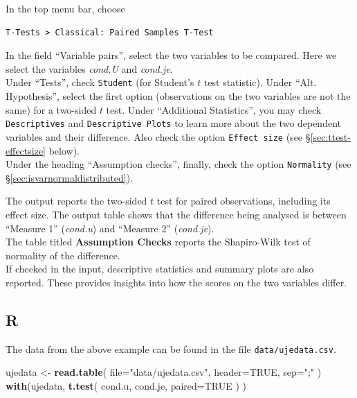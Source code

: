 \documentclass[
]{book}
\newenvironment{Shaded}{\begin{snugshade}}{\end{snugshade}}
\newcommand{\DataTypeTok}[1]{\textcolor[rgb]{0.13,0.29,0.53}{#1}}
\newcommand{\KeywordTok}[1]{\textcolor[rgb]{0.13,0.29,0.53}{\textbf{#1}}}
\newcommand{\NormalTok}[1]{#1}
\newcommand{\OtherTok}[1]{\textcolor[rgb]{0.56,0.35,0.01}{#1}}
\newcommand{\StringTok}[1]{\textcolor[rgb]{0.31,0.60,0.02}{#1}}
\begin{document}
In the top menu bar, choose

\begin{verbatim}
T-Tests > Classical: Paired Samples T-Test
\end{verbatim}

In the field ``Variable pairs'', select the two variables to be compared. Here we select the variables \emph{cond.U} and \emph{cond.je}.\\
Under ``Tests'', check \texttt{Student} (for Student's \(t\) test statistic). Under ``Alt. Hypothesis'', select the first option (observations on the two variables are not the same) for a two-sided \(t\) test.
Under ``Additional Statistics'', you may check \texttt{Descriptives} and \texttt{Descriptive\ Plots} to learn more about the two dependent variables and their difference. Also check the option \texttt{Effect\ size} (see §\ref{sec:ttest-effectsize} below).\\
Under the heading ``Assumption checks'', finally, check the option \texttt{Normality} (see §\ref{sec:isvarnormaldistributed}).

The output reports the two-sided \(t\) test for paired observations, including its effect size. The output table shows that the difference being analysed is between ``Measure 1'' (\emph{cond.u}) and ``Measure 2'' (\emph{cond.je}).\\
The table titled \textbf{Assumption Checks} reports the Shapiro-Wilk test of normality of the difference.\\
If checked in the input, descriptive statistics and summary plots are also reported. These provides insights into how the scores on the two variables differ.

\hypertarget{sec:R-ttest-paired}{%
\subsection{R}\label{sec:R-ttest-paired}}

The data from the above example can be found in the file \texttt{data/ujedata.csv}.

\begin{Shaded}
\begin{Highlighting}[]
\NormalTok{ujedata \textless{}{-}}\StringTok{ }\KeywordTok{read.table}\NormalTok{( }\DataTypeTok{file=}\StringTok{"data/ujedata.csv"}\NormalTok{, }\DataTypeTok{header=}\OtherTok{TRUE}\NormalTok{, }\DataTypeTok{sep=}\StringTok{";"}\NormalTok{ )}
\KeywordTok{with}\NormalTok{(ujedata, }\KeywordTok{t.test}\NormalTok{( cond.u, cond.je, }\DataTypeTok{paired=}\OtherTok{TRUE}\NormalTok{ ) )}
\end{Highlighting}
\end{Shaded}
\end{document}
